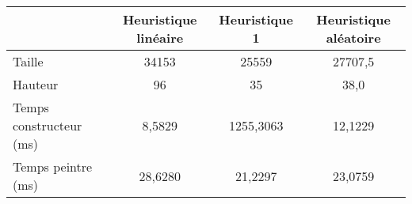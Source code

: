 \begin{center}
{\tabulinesep=1.2mm
\begin{tabu}{|l|c|c|c|}
  \hline
  & Heuristique linéaire  & Heuristique 1 & Heuristique aléatoire \\ 
  \hline
  Taille &     34153&     25559&   27707,5  \\ 
  \hline
  Hauteur &        96&        35&      38,0  \\ 
  \hline
  Temps constructeur (ms) &          8,5829&       1255,3063&         12,1229  \\ 
  \hline
  Temps peintre (ms) &           28,6280&          21,2297&          23,0759  \\ 
  \hline
\end{tabu}
}
\end{center}


